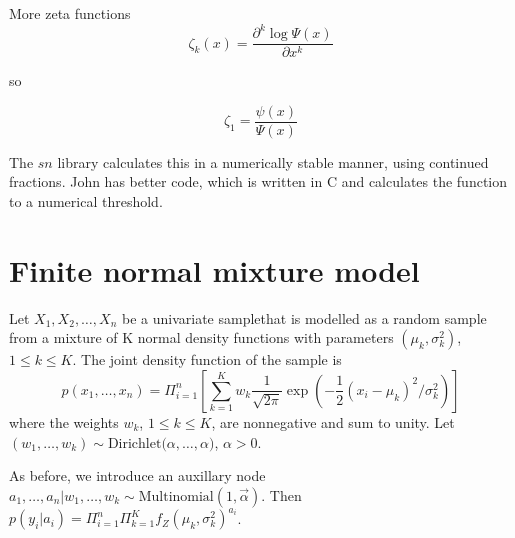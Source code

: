 \documentclass{amsart}
\begin{document}
More zeta functions
\[
\zeta_k(x) = \frac{\partial^k \log{\Psi(x)}}{\partial x^k}
\]

so

\[
\zeta_1 = \frac{\psi(x)}{\Psi(x)}
\]

The $sn$ library calculates this in a numerically stable manner, using continued fractions.
John has better code, which is written in C and calculates the function to a numerical
threshold.

\section{Finite normal mixture model}
Let $X_1, X_2, \ldots, X_n$ be a univariate samplethat is modelled as a random sample from a
mixture of K normal density functions with parameters $(\mu_k, \sigma_k^2)$,
$1 \leq k \leq K$. The joint density function of the sample is
\[
p(x_1, \ldots, x_n) = \Pi_{i=1}^n \left [ \sum_{k=1}^K w_k \frac{1}{\sqrt{2 \pi}} \exp{ \left( -\frac{1}{2}(x_i - \mu_k)^2/\sigma_k^2 \right)} \right ]
\]
where the weights $w_k$, $1 \leq k \leq K$, are nonnegative and sum to unity. Let 
$(w_1, \ldots, w_k) \sim \text{Dirichlet($\alpha, \ldots, \alpha$)}$, $\alpha > 0$.


As before, we introduce an auxillary node
$a_1, \ldots, a_n|w_1, \ldots, w_k \sim \text{Multinomial}(1, \vec{\alpha})$. Then
$p(y_i|a_i) = \Pi_{i=1}^n \Pi_{k=1}^K f_Z(\mu_k, \sigma_{k}^2)^{a_i}$.
\end{document}

